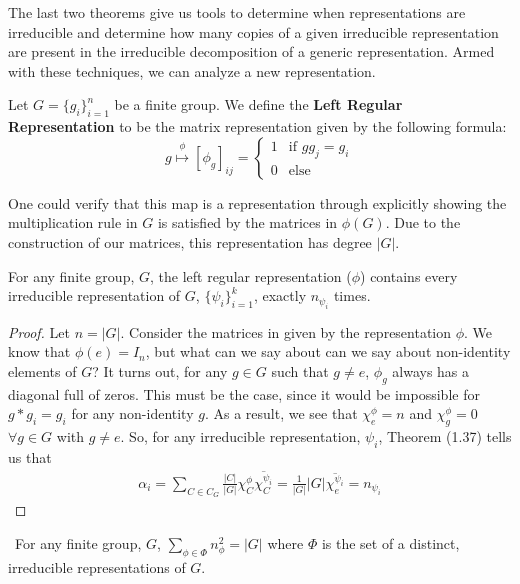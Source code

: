 The last two theorems give us tools to determine when representations are irreducible and determine how many copies of a given irreducible representation are present in the irreducible decomposition of a generic representation. Armed with these techniques, we can analyze a new representation.

\begin{definition}
	Let $G=\{g_i\}^n_{i=1}$ be a finite group. We define the \textbf{Left Regular Representation} to be the matrix representation given by the following formula:
$$g\stackrel{\phi}{\mapsto} [\phi_g]_{ij} = \begin{cases}
								1 & \text{if } gg_j = g_i \\
								0 & \text{else}
							\end{cases}$$
\end{definition}

One could verify that this map is a representation through explicitly showing the multiplication rule in $G$ is satisfied by the matrices in $\phi(G)$. Due to the construction of our matrices, this representation has degree $|G|$. 

\begin{theorem}
	For any finite group, $G$, the left regular representation ($\phi$) contains every irreducible representation of $G$, $\{\psi_i\}_{i=1}^k$, exactly $n_{\psi_i}$ times.
\end{theorem}

\noindent\begin{proof}\cite{Tung}  Let $n=|G|$. Consider the matrices in given by the representation $\phi$. We know that $\phi(e) = I_n$, but what can we say about can we say about non-identity elements of $G$? It turns out, for any $g\in G$ such that $g\neq e$, $\phi_g$ always has a diagonal full of zeros. This must be the case, since it would be impossible for $g *g_i = g_i$  for any non-identity $g$. As a result, we see that $\chi^\phi_e = n$ and $\chi^\phi_g = 0$ $\forall g \in G$ with $g \neq e$. So, for any irreducible representation, $\psi_i$, Theorem (1.37) tells us that 
\begin{equation}
	\begin{aligned}
		\alpha_i = \sum_{C\in C_G} \frac{|C|}{|G|} \chi^\phi_C \overline{\chi_C^{\psi_i}} = \frac{1}{|G|}|G| \overline{\chi_e^{\psi_i}} = n_{\psi_i}
	\end{aligned}
\end{equation}
\end{proof}

\begin{corrolary}
\	For any finite group, $G$, $\sum_{\phi \in \Phi} n_\phi^2 = |G|$ where $\Phi$ is the set of a distinct, irreducible representations of $G$.
\end{corrolary}

